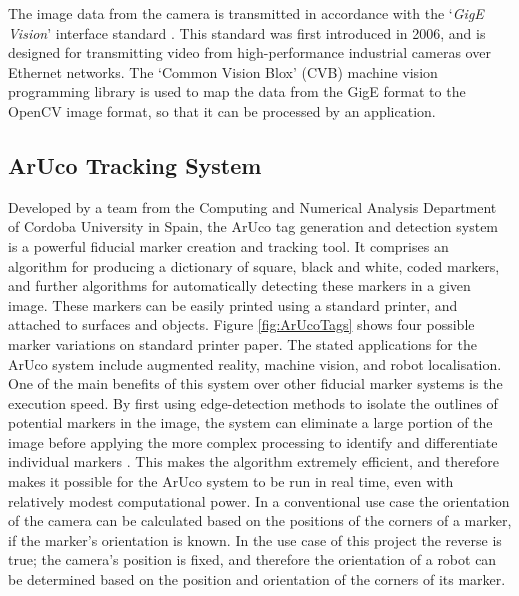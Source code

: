 The image data from the camera is transmitted in accordance with the `\textit{GigE Vision}' interface standard \cite{GigEVision}. This standard was first introduced in 2006, and is designed for transmitting video from high-performance industrial cameras over Ethernet networks. The `Common Vision Blox' (CVB) machine vision programming library is used to map the data from the GigE format to the OpenCV image format, so that it can be processed by an application.


\subsection{ArUco Tracking System} \label{ArUco}
Developed by a team from the Computing and Numerical Analysis Department of Cordoba University in Spain, the ArUco tag generation and detection system \cite{Garrido:2014} is a powerful fiducial marker creation and tracking tool. It comprises an algorithm for producing a dictionary of square, black and white, coded markers, and further algorithms for automatically detecting these markers in a given image. These markers can be easily printed using a standard printer, and attached to surfaces and objects. Figure \ref{fig:ArUcoTags} shows four possible marker variations on standard printer paper. The stated applications for the ArUco system include augmented reality, machine vision, and robot localisation. One of the main benefits of this system over other fiducial marker systems is the execution speed. By first using edge-detection methods to isolate the outlines of potential markers in the image, the system can eliminate a large portion of the image before applying the more complex processing to identify and differentiate individual markers \cite{Garrido:2014}. This makes the algorithm extremely efficient, and therefore makes it possible for the ArUco system to be run in real time, even with relatively modest computational power. In a conventional use case the orientation of the camera can be calculated based on the positions of the corners of a marker, if the marker's orientation is known. In the use case of this project the reverse is true; the camera's position is fixed, and therefore the orientation of a robot can be determined based on the position and orientation of the corners of its marker.

